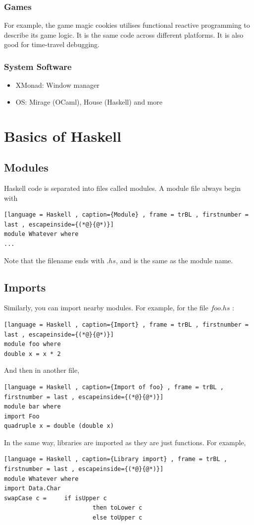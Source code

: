 \documentclass[a4paper]{article}
\theoremstyle{plain}
\theoremstyle{definition}
\theoremstyle{remark}
\begin{document}
\subsubsection{Games}
For example, the game magic cookies utilises functional reactive programming to describe its game logic. It is the same code across different platforms. It is also good for time-travel debugging.
\subsubsection{System Software}
\begin{itemize}
	\item XMonad: Window manager
	\item OS: Mirage (OCaml), House (Haskell) and more
\end{itemize}
\section{Basics of Haskell}
\subsection{Modules}
Haskell code is separated into files called modules. A module file always begin with
\begin{lstlisting}[language = Haskell , caption={Module} , frame = trBL , firstnumber = last , escapeinside={(*@}{@*)}]
module Whatever where
...
\end{lstlisting}
Note that the filename ends with $.hs$, and is the same as the module name.
\subsection{Imports}
Similarly, you can import nearby modules. For example, for the file $foo.hs$ :
\begin{lstlisting}[language = Haskell , caption={Import} , frame = trBL , firstnumber = last , escapeinside={(*@}{@*)}]
module foo where
double x = x * 2
\end{lstlisting}
And then in another file,
\begin{lstlisting}[language = Haskell , caption={Import of foo} , frame = trBL , firstnumber = last , escapeinside={(*@}{@*)}]
module bar where
import Foo
quadruple x = double (double x)
\end{lstlisting}
In the same way, libraries are imported as they are just functions. For example,
\begin{lstlisting}[language = Haskell , caption={Library import} , frame = trBL , firstnumber = last , escapeinside={(*@}{@*)}]
module Whatever where
import Data.Char
swapCase c =	 if isUpper c
					     then toLower c
				    	 else toUpper c
\end{lstlisting}
\end{document}

